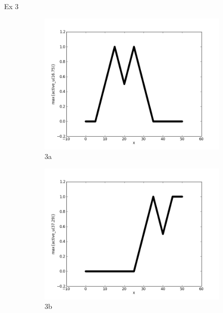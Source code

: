 \documentclass{report}
\begin{document}
Ex 3
\begin{figure}[ht]
        \begin{subfigure}[b]{0.5\textwidth}
                \centering
                \includegraphics[width=\textwidth]{ex3a.png}
                \caption{3a}
        \end{subfigure}
	\begin{subfigure}[b]{0.5\textwidth}
                \centering
                \includegraphics[width=\textwidth]{ex3b.png}
                \caption{3b}
	\end{subfigure}
	\begin{subfigure}[b]{0.5\textwidth}
                \centering

\end{subfigure}
\end{figure}
\end{document}
